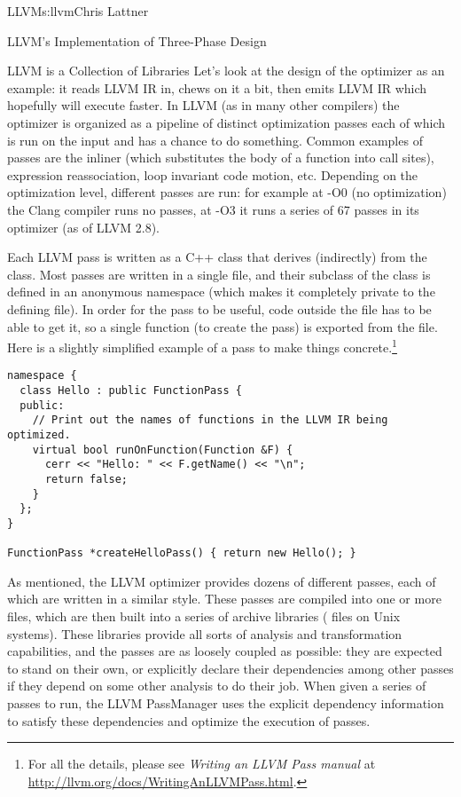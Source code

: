 \begin{aosachapter}{LLVM}{s:llvm}{Chris Lattner}
\begin{aosasect1}{LLVM's Implementation of Three-Phase Design}
\begin{aosasect2}{LLVM is a Collection of Libraries}
Let's look at the design of the optimizer as an example: it reads LLVM
IR in, chews on it a bit, then emits LLVM IR which hopefully will
execute faster.  In LLVM (as in many other compilers) the optimizer is
organized as a pipeline of distinct optimization passes each of which
is run on the input and has a chance to do something.  Common examples
of passes are the inliner (which substitutes the body of a function
into call sites), expression reassociation, loop invariant code
motion, etc.  Depending on the optimization level, different passes
are run: for example at -O0 (no optimization) the Clang compiler runs
no passes, at -O3 it runs a series of 67 passes in its optimizer (as
of LLVM 2.8).

Each LLVM pass is written as a C++ class that derives (indirectly)
from the  class.  Most passes are written in a single
 file, and their subclass of the  class is
defined in an anonymous namespace (which makes it completely private
to the defining file).  In order for the pass to be useful, code
outside the file has to be able to get it, so a single function (to
create the pass) is exported from the file.  Here is a slightly
simplified example of a pass to make things concrete.\footnote{ For
all the details, please see \emph{Writing an LLVM Pass manual} at
\url{http://llvm.org/docs/WritingAnLLVMPass.html}.  }

\begin{verbatim}
namespace {
  class Hello : public FunctionPass {
  public:
    // Print out the names of functions in the LLVM IR being optimized.
    virtual bool runOnFunction(Function &F) {
      cerr << "Hello: " << F.getName() << "\n";
      return false;
    }
  };
}

FunctionPass *createHelloPass() { return new Hello(); }
\end{verbatim}

As mentioned, the LLVM optimizer provides dozens of different passes,
each of which are written in a similar style.  These passes are
compiled into one or more  files, which are then built into a
series of archive libraries ( files on Unix systems). These
libraries provide all sorts of analysis and transformation
capabilities, and the passes are as loosely coupled as possible: they
are expected to stand on their own, or explicitly declare their
dependencies among other passes if they depend on some other analysis
to do their job.  When given a series of passes to run, the LLVM
PassManager uses the explicit dependency information to satisfy these
dependencies and optimize the execution of passes.


\end{aosasect2}
\end{aosasect1}
\end{aosachapter}

